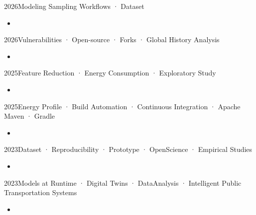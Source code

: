 
 {2026}{Modeling Sampling Workflows · Dataset }{}
{\begin{itemize}
\item {}
\end{itemize}}
\hfill \smallskip

 {2026}{Vulnerabilities · Open-source · Forks · Global History Analysis}{}
{\begin{itemize}
\item {}
\end{itemize}}

 {2025}{Feature Reduction · Energy Consumption · Exploratory Study}{}
{\begin{itemize}
\item {}
\end{itemize}}

 {2025}{Energy Profile · Build Automation · Continuous Integration · Apache Maven · Gradle}{}
{\begin{itemize}
\item {}
\end{itemize}}


 {2023}{Dataset · Reproducibility · Prototype · OpenScience · Empirical Studies}{}
{\begin{itemize}
\item {}
\end{itemize}}

 {2023}{Models at Runtime · Digital Twins · DataAnalysis · Intelligent Public Transportation Systems}{}
{\begin{itemize}
\item {}
\end{itemize}}


